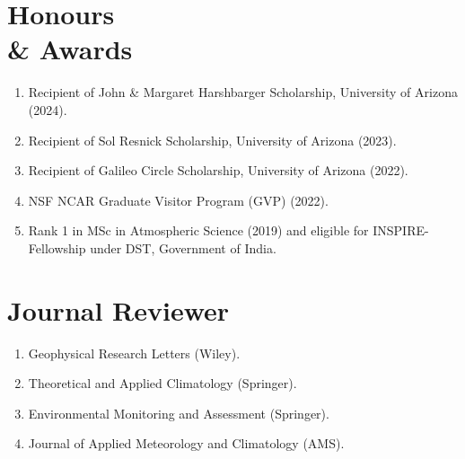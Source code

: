 \documentclass[margin,line]{resume}
\begin{document}
\begin{resume}
			
			\vspace*{-3mm}
			
			\section{\mysidestyle \textbf{\textcolor{sep}{Honours \\\& Awards}}}
			\begin{enumerate}[topsep=0.1pt, partopsep=1pt, itemsep=0.1pt, parsep=0.1pt, leftmargin=12pt,label=\roman{*})]
				\item Recipient of John \& Margaret Harshbarger Scholarship, University of Arizona (2024).
				\item Recipient of Sol Resnick Scholarship, University of Arizona (2023).
				\item Recipient of Galileo Circle Scholarship, University of Arizona (2022).
				\item NSF NCAR Graduate Visitor Program (GVP) (2022).
				\item Rank 1 in MSc in Atmospheric Science (2019) and eligible for INSPIRE-Fellowship under DST, Government of India.
				
			\end{enumerate} 
			\vspace*{-3mm}
			
			\section{\mysidestyle \textbf{\textcolor{sep}{Journal Reviewer}}}
			\begin{enumerate}[topsep=0.1pt, partopsep=1pt, itemsep=0.1pt, parsep=0.1pt, leftmargin=12pt,label=\roman{*})]
				\item Geophysical Research Letters (Wiley).
				\item Theoretical and Applied Climatology (Springer).
				\item Environmental Monitoring and Assessment (Springer).
				\item 
				Journal of Applied Meteorology and Climatology (AMS).
				

\end{enumerate}
\end{resume}
\end{document}
